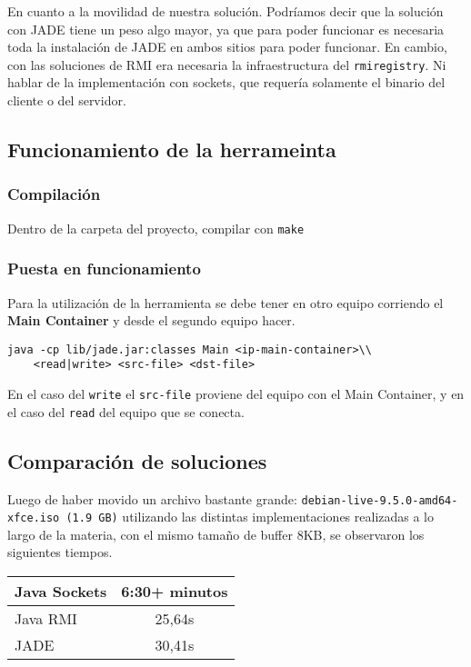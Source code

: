 En cuanto a la movilidad de nuestra solución. Podríamos decir que la solución con JADE tiene un peso algo mayor, ya que para poder funcionar es necesaria toda la instalación de JADE en ambos sitios para poder funcionar. En cambio, con las soluciones de RMI era necesaria la infraestructura del \texttt{rmiregistry}. Ni hablar de la implementación con sockets, que requería solamente el binario del cliente o del servidor.

\subsection{Funcionamiento de la herrameinta}

\subsubsection{Compilación}

Dentro de la carpeta del proyecto, compilar con \texttt{make} 

\subsubsection{Puesta en funcionamiento}

Para la utilización de la herramienta se debe tener en otro equipo corriendo el \textbf{Main Container} y desde el segundo equipo hacer.

\begin{lstlisting}[breaklines=true]
java -cp lib/jade.jar:classes Main <ip-main-container>\\
    <read|write> <src-file> <dst-file>
\end{lstlisting}

En el caso del \texttt{write} el \texttt{src-file} proviene del equipo con el Main Container, y en el caso del \texttt{read} del equipo que se conecta.

\subsection{Comparación de soluciones}

Luego de haber movido un archivo bastante grande: \texttt{debian-live-9.5.0-amd64-xfce.iso (1.9 GB)} utilizando las distintas implementaciones realizadas a lo largo de la materia, con el mismo tamaño de buffer 8KB, se observaron los siguientes tiempos.

\begin{center}
  \begin{tabular}{ | l | c | }
    \hline
    Java Sockets & 6:30+ minutos \\
    \hline
    Java RMI & 25,64s\\
    \hline
    JADE & 30,41s \\
    \hline
  \end{tabular}
\end{center}

